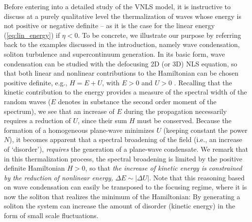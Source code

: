 \documentclass[pra,twocolumn,showpacs,preprintnumbers,amsmath,amssymb]{revtex4}
\begin{document}
Before entering into a detailed study of the VNLS model, it is instructive to discuss at a purely qualitative level the thermalization of waves whose energy is not positive or negative definite -- as it is the case for the linear energy (\ref{eq:lin_energy}) if $\eta < 0$. 
To be concrete, we  illustrate our purpose by referring back to the examples discussed in the introduction, namely wave condensation, soliton turbulence and supercontinuum generation.
In its basic form, wave condensation can be studied with the defocusing 2D (or 3D) NLS equation, so that both linear and nonlinear contributions to the Hamiltonian can be chosen positive definite, e.g., $H=E+U$, with $E>0$ and $U>0$ \cite{nazarenko05,PRL05}.
Recalling that the kinetic contribution to the energy provides a measure of the spectral width of the random waves ($E$ denotes in substance the second order moment of the spectrum), we see that an increase of $E$ during the propagation necessarily requires a reduction of $U$, since their sum $H$ must be conserved.
Because the formation of a homogeneous plane-wave minimizes $U$ (keeping constant the power $N$), it becomes apparent that a spectral broadening of the field (i.e., an increase of `disorder'), {\it requires} the generation of a plane-wave condensate.
We remark that in this thermalization process, the spectral broadening is limited by the positive definite Hamiltonian $H>0$, so that {\it the increase of kinetic energy is constrained by the reduction of nonlinear energy,} $\Delta E \sim |\Delta U|$. 
Note that this reasoning based on wave condensation can easily be transposed to the focusing regime, where it is now the soliton that realizes the minimum of the Hamiltonian: By generating a soliton the system can increase the amount of disorder (kinetic energy) in the form of small scale fluctuations.
\end{document}
